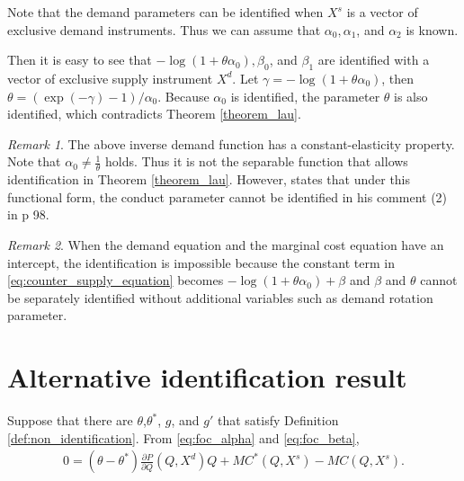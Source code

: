 \documentclass[11pt, a4paper]{article}
\theoremstyle{remark}
\newtheorem{remark}{Remark}
\begin{document}
Note that the demand parameters can be identified when $X^s$ is a vector of exclusive demand instruments.
Thus we can assume that $\alpha_0, \alpha_1$, and $\alpha_2$ is known.  

Then it is easy to see that $- \log(1 + \theta\alpha_0), \beta_0$, and $\beta_1$ are identified with a vector of exclusive supply instrument $X^d$.
Let $\gamma = - \log(1 + \theta\alpha_0)$, then $\theta = (\exp(-\gamma) - 1)/\alpha_0$.
Because $\alpha_0$ is identified, the parameter $\theta$ is also identified, which contradicts Theorem \ref{theorem_lau}.
\begin{remark}
    The above inverse demand function has a constant-elasticity property. 
    Note that $\alpha_0 \ne \frac{1}{\theta}$ holds.
    Thus it is not the separable function that allows identification in Theorem \ref{theorem_lau}.
    However, \citet{lau1982identifying} states that under this functional form, the conduct parameter cannot be identified in his comment (2) in p 98.
\end{remark}

\begin{remark}
    When the demand equation and the marginal cost equation have an intercept, the identification is impossible because the constant term in \eqref{eq:counter_supply_equation} becomes $-\log(1+\theta \alpha_0) + \beta$ and $\beta$ and $\theta$ cannot be separately identified without additional variables such as demand rotation parameter.
\end{remark}

\section{Alternative identification result}

Suppose that there are $\theta$,$\theta^{*}$, $g$, and $g'$ that satisfy Definition \ref{def:non_identification}.
From \eqref{eq:foc_alpha} and \eqref{eq:foc_beta},
\begin{align}
    0 = (\theta - \theta^{*})\frac{\partial P}{\partial Q}(Q,X^{d})Q + MC^{*}(Q,X^{s}) - MC(Q,X^{s}). 
\end{align}
\end{document}
